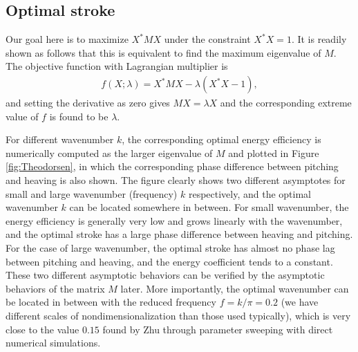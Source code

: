\subsection{Optimal stroke}

Our goal here is to maximize $X^* M X$ under the constraint $X^* X = 1$.
It is readily shown as follows that this is equivalent to find the maximum eigenvalue of $M$.
The objective function with Lagrangian multiplier is 
\begin{align}
f(X; \lambda) = X^* M X - \lambda (X^* X - 1),
\end{align}
and setting the derivative as zero gives $MX = \lambda X$ and the corresponding extreme value of $f$ is found to be $\lambda$.

For different wavenumber $k$, the corresponding optimal energy efficiency is numerically computed as the larger eigenvalue of $M$ and plotted in Figure \ref{fig:Theodorsen}, in which the corresponding phase difference between pitching and heaving is also shown.
The figure clearly shows two different asymptotes for small and large wavenumber (frequency) $k$ respectively, and the optimal wavenumber $k$ can be located somewhere in between.
For small wavenumber, the energy efficiency is generally very low and grows linearly with the wavenumber, and the optimal stroke has a large phase difference between heaving and pitching.
For the case of large wavenumber, the optimal stroke has almost no phase lag between pitching and heaving, and the energy coefficient tends to a constant.
These two different asymptotic behaviors can be verified by the asymptotic behaviors of the matrix $M$ later.
More importantly, the optimal wavenumber can be located in between with the reduced frequency $f = k/\pi = 0.2$ (we have different scales of nondimensionalization than those used typically), which is very close to the value $0.15$ found by Zhu through parameter sweeping with direct numerical simulations.

